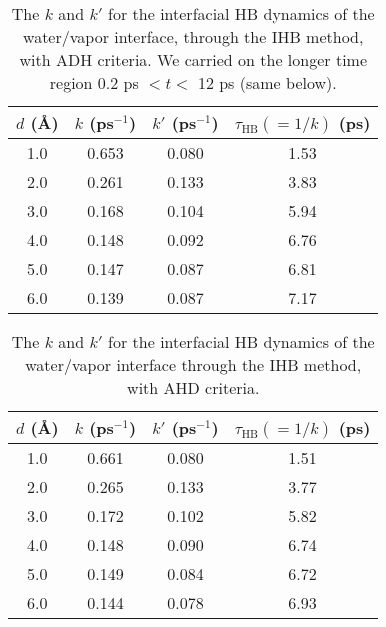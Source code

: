 %
\begin{table}[H]%
\centering
\caption{\label{tab:k_k_prime_tau_128w_pure_ihb_ADH} 
    The $k$ and $k'$ for the interfacial HB dynamics of the water/vapor interface, through the IHB method, with ADH criteria. 
We carried on the longer time region 0.2 ps $< t <$ 12 ps (same below). 
}
\begin{tabular}{cccc}
 $d$ (\AA) & $k$ (ps$^{-1}$) & $k'$ (ps$^{-1}$)& $\tau_{\text{HB}} (=1/k)$ (ps) \\
\hline
  1.0 & 0.653 & 0.080 & 1.53  \\
  2.0 & 0.261 & 0.133 & 3.83  \\
  3.0 & 0.168 & 0.104 & 5.94  \\
  4.0 & 0.148 & 0.092 & 6.76  \\
  5.0 & 0.147 & 0.087 & 6.81  \\
  6.0 & 0.139 & 0.087 & 7.17  \\
\end{tabular}
\end{table}
\begin{table}[htb]
\centering
\caption{\label{tab:k_k_prime_tau_128w_pure_ihb_AHD} 
    The $k$ and $k'$ for the interfacial HB dynamics of the water/vapor interface through the IHB method, with AHD criteria.} 
\begin{tabular}{cccc}
 $d$ (\AA) & $k$ (ps$^{-1}$) & $k'$ (ps$^{-1}$) & $\tau_{\text{HB}} (=1/k)$ (ps) \\
\hline
  1.0 & 0.661 & 0.080 & 1.51  \\
  2.0 & 0.265 & 0.133 & 3.77  \\
  3.0 & 0.172 & 0.102 & 5.82  \\
  4.0 & 0.148 & 0.090 & 6.74  \\
  5.0 & 0.149 & 0.084 & 6.72  \\
  6.0 & 0.144 & 0.078 & 6.93  \\
\end{tabular}
\end{table}

